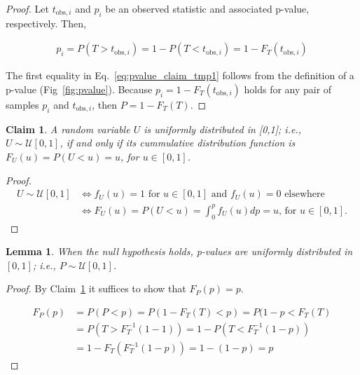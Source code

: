 \documentclass[12pt]{article}
\newtheorem{claim}{Claim}
\newtheorem{lemma}{Lemma}
\begin{document}
\begin{appendices}
\begin{proof}
    Let $t_{\text{obs},i}$ and $p_i$ be an observed statistic and associated
    p-value, respectively. Then,

    \begin{align}
        p_i=P(T>t_{\text{obs},i})=1-P(T<t_{\text{obs},i})=1-F_T(t_{\text{obs},i})\label{eq:pvalue_claim_tmp1}
    \end{align}

    The first equality in Eq.~\ref{eq:pvalue_claim_tmp1} follows from the
    definition of a p-value (Fig~\ref{fig:pvalue}). Because
    $p_i=1-F_T(t_{\text{obs},i})$ holds for any pair of samples $p_i$
    and $t_{\text{obs},i}$, then $P=1-F_T(T)$.
\end{proof}

\begin{claim}

    A random variable $U$ is uniformly distributed in [0,1]; i.e.,
    $U\sim\mathcal{U}[0,1]$, if and only if its cummulative distribution
    function is $F_U(u)=P(U<u)=u$, for $u\in[0,1]$.
    \label{claim:uniform_cummulative}

\end{claim}

\begin{proof}

    \begin{align}
        U\sim\mathcal{U}[0,1] &\iff f_U(u)=1 \text{ for } u\in[0,1] \text{ and } f_U(u)=0 \text{ elsewhere } \\
                              &\iff F_U(u)=P(U<u)=\int_0^pf_U(u)dp=u\text{, for }u\in[0,1].
    \end{align}

\end{proof}

\begin{lemma}

    When the null hypothesis holds, p-values are uniformly distributed in
    $[0,1]$; i.e., $P\sim\mathcal{U}[0,1]$.
    \label{lemma:p_values_uniform01}
\end{lemma}

\begin{proof}
    By Claim~\ref{claim:uniform_cummulative} it suffices to show that $F_P(p)=p$.

    \begin{align}
        F_P(p)&=P(P<p)=P(1-F_T(T)<p)=P(1-p<F_T(T)\label{eq:lemmaUniformPvaluesLine1}\\
              &=P(T>F_T^{-1}(1-1))=1-P(T<F_T^{-1}(1-p))\nonumber\\
              &=1-F_T(F_T^{-1}(1-p))=1-(1-p)=p\nonumber
    \end{align}


\end{proof}
\end{appendices}
\end{document}

